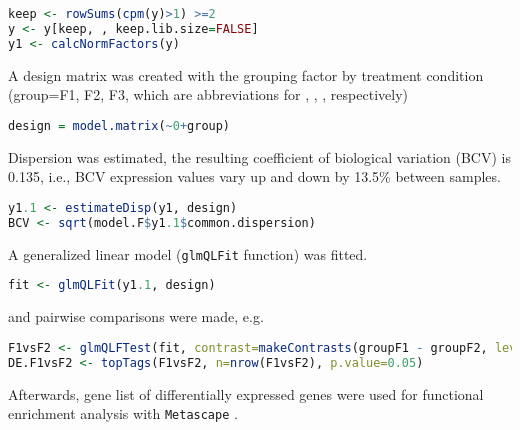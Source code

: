 \begin{lstlisting}[language=R,style=defaultstyle]
keep <- rowSums(cpm(y)>1) >=2
y <- y[keep, , keep.lib.size=FALSE]
y1 <- calcNormFactors(y)
\end{lstlisting}

A design matrix was created with the grouping factor by treatment condition
(group=F1, F2, F3, which are abbreviations for \CMina, \nMAina, \MAina,
respectively)

\begin{lstlisting}[language=R,style=defaultstyle]
design = model.matrix(~0+group)
\end{lstlisting}

Dispersion was estimated, the resulting coefficient of biological variation
(BCV) is 0.135, i.e., BCV expression values vary up and down by 13.5\% between
samples.

\begin{lstlisting}[language=R,style=defaultstyle]
y1.1 <- estimateDisp(y1, design)
BCV <- sqrt(model.F$y1.1$common.dispersion)
\end{lstlisting}

A generalized linear model (\texttt{glmQLFit} function) was fitted.

\begin{lstlisting}[language=R,style=defaultstyle]
fit <- glmQLFit(y1.1, design)
\end{lstlisting}

and pairwise comparisons were made, e.g.

\begin{lstlisting}[language=R,style=defaultstyle]
F1vsF2 <- glmQLFTest(fit, contrast=makeContrasts(groupF1 - groupF2, levels=design))
DE.F1vsF2 <- topTags(F1vsF2, n=nrow(F1vsF2), p.value=0.05)
\end{lstlisting}

Afterwards, gene list of differentially expressed genes were used for functional
enrichment analysis with \texttt{Metascape}
\cite{zhouMetascapeProvidesBiologistoriented2019}.


